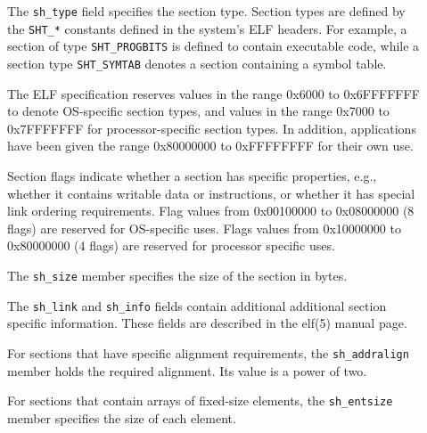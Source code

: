 \documentclass[a4paper,pdftex]{book}
\makeatletter
\newcommand{\constant}[1]{\texttt{#1}}
\newcommand{\parameter}[1]{\texttt{#1}}
\newenvironment{callout}[2][black]{%
  \begingroup\newcommand{\@cocolor}{#1}%
  \setlength{\shadowsize}{1.2pt}%
  \newcommand{\@cogroup}[1]{#2}}{\endgroup}
\newcommand{\@co}[1]{\shadowbox{\color{\@cocolor}#1}}
\newcommand{\coref}[1]{%
  \hypertarget{\@cogroup.#1.cr}{%
    \hyperlink{\@cogroup.#1.co}{\@co{#1}}}}
\makeatother
\begin{document}
\begin{callout}{shdr}
\begin{description}
  \item[\coref{2}] The \parameter{sh\_type} field specifies the
    section type.  Section types are defined by the \constant{SHT\_*}
    constants defined in the system's ELF headers.  For example, a
    section of type \constant{SHT\_PROGBITS} is defined to contain
    executable code, while a section type \constant{SHT\_SYMTAB}
    denotes a section containing a symbol table.%

    The ELF specification reserves values in the range 0x6000 to
    0x6FFF\-FFFF to denote OS-specific section types, and values in the
    range 0x7000 to 0x7FFF\-FFFF for processor-specific section
    types.  In addition, applications have been given the range
    0x80000000 to 0xFFFFFFFF for their own use.%

  \item[\coref{3}] Section flags indicate whether a section has
    specific properties, e.g., whether it contains writable data or
    instructions, or whether it has special link ordering
    requirements.  Flag values from 0x00100000 to 0x08000000 (8 flags)
    are reserved for OS-specific uses.  Flags values from 0x10000000
    to 0x80000000 (4 flags) are reserved for processor specific uses.%

  \item[\coref{4}] The \parameter{sh\_size} member specifies the size
    of the section in bytes.%

  \item[\coref{5} \coref{6}] The \parameter{sh\_link} and
    \parameter{sh\_info} fields contain additional additional section
    specific information.  These fields are described in the elf(5)
    manual page.

  \item[\coref{7}] For sections that have specific alignment
    requirements, the \parameter{sh\_addralign} member holds the
    required alignment.  Its value is a power of two.%

  \item[\coref{8}] For sections that contain arrays of fixed-size
    elements, the \parameter{sh\_entsize} member specifies the size of
    each element.%
  \end{description}
\end{callout}
\end{document}
